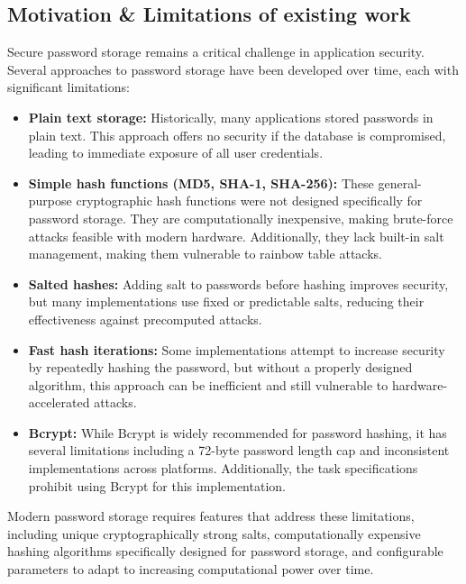 \documentclass[11pt,a4paper]{article}
\begin{document}
            \subsection{Motivation \& Limitations of existing work} 
            Secure password storage remains a critical challenge in application security. Several approaches to password storage have been developed over time, each with significant limitations:
            \begin{itemize}
              \item \textbf{Plain text storage:} Historically, many applications stored passwords in plain text. This approach offers no security if the database is compromised, leading to immediate exposure of all user credentials.
              
              \item \textbf{Simple hash functions (MD5, SHA-1, SHA-256):} These general-purpose cryptographic hash functions were not designed specifically for password storage. They are computationally inexpensive, making brute-force attacks feasible with modern hardware. Additionally, they lack built-in salt management, making them vulnerable to rainbow table attacks.
              
              \item \textbf{Salted hashes:} Adding salt to passwords before hashing improves security, but many implementations use fixed or predictable salts, reducing their effectiveness against precomputed attacks.
              
              \item \textbf{Fast hash iterations:} Some implementations attempt to increase security by repeatedly hashing the password, but without a properly designed algorithm, this approach can be inefficient and still vulnerable to hardware-accelerated attacks.
              
              \item \textbf{Bcrypt:} While Bcrypt is widely recommended for password hashing, it has several limitations including a 72-byte password length cap and inconsistent implementations across platforms. Additionally, the task specifications prohibit using Bcrypt for this implementation.
            \end{itemize}
            
            Modern password storage requires features that address these limitations, including unique cryptographically strong salts, computationally expensive hashing algorithms specifically designed for password storage, and configurable parameters to adapt to increasing computational power over time.            
\end{document}
